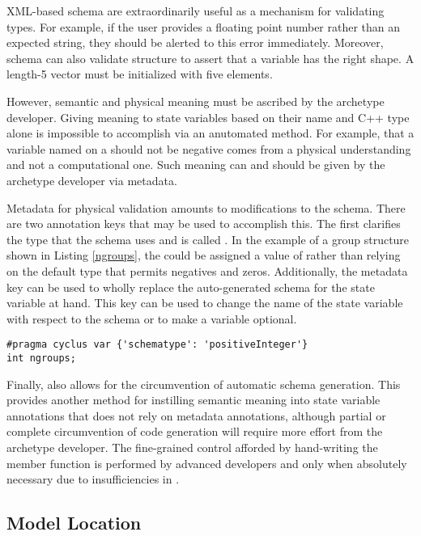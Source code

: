 \gls{XML}-based schema are extraordinarily useful as a mechanism for validating types. 
For example, if the user provides a floating point number rather than an 
expected string, they should be alerted to this error immediately.
Moreover, schema can also validate structure to assert that 
a variable has the right shape. A length-5 vector must be initialized with 
five elements. 

However, semantic and physical meaning must be ascribed by the archetype developer.
Giving meaning to state variables based
on their name and C++ type alone is impossible to accomplish via an anutomated
method. For example, that a variable named  
on a  should not be negative comes from a physical understanding
and not a computational one. Such meaning can and should be given by the 
archetype developer via metadata.

Metadata for physical validation amounts to modifications to the schema. There are 
two annotation keys that may be used to accomplish this.  The first clarifies the 
type that the schema uses and is called .  
In the example of a group structure shown in Listing \ref{ngroups}, the 
 could be assigned a value of 
 rather than relying on the default  type
that permits negatives and zeros. Additionally, the metadata key 
can be used to wholly replace the auto-generated schema for the state variable at 
hand. This key can be used to change the name of the state variable with respect 
to the schema or to make a variable optional.

\begin{lstlisting}[caption={Physical Constraint Addition via `schematype'}, label=ngroups]
#pragma cyclus var {'schematype': 'positiveInteger'}
int ngroups;
\end{lstlisting}

Finally, \Cyclus also allows for the circumvention of automatic schema generation. This 
provides another method for instilling semantic meaning into state variable annotations
that does not rely on metadata annotations, although
partial or complete circumvention of code generation will require
more effort from the archetype developer. The fine-grained control afforded by 
hand-writing the  member function is performed 
by advanced developers and only when absolutely necessary due to insufficiencies 
in \cycpp.

\subsection{Model Location}


